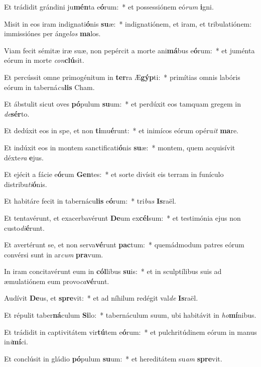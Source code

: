 \item Et trádidit grándini ju\textbf{mén}ta e\textbf{ó}rum:~* et possessiónem eó\textit{rum} \textbf{i}gni.
\item Misit in eos iram indignati\textbf{ó}nis \textbf{su}æ:~* indignatiónem, et iram, et tribulatiónem: immissiónes per ánge\textit{los} \textbf{ma}los.
\item Viam fecit sémitæ iræ suæ, non pepércit a morte ani\textbf{má}bus e\textbf{ó}rum:~* et juménta eórum in morte \textit{con}\textbf{clú}sit.
\item Et percússit omne primogénitum in \textbf{ter}ra Æ\textbf{gýp}ti:~* primítias omnis labóris eórum in taberná\textit{cu}\textbf{lis} Cham.
\item Et ábstulit sicut oves \textbf{pó}pulum \textbf{su}um:~* et perdúxit eos tamquam gregem in \textit{de}\textbf{sér}to.
\item Et dedúxit eos in spe, et non \textbf{ti}mu\textbf{é}runt:~* et inimícos eórum opéru\textit{it} \textbf{ma}re.
\item Et indúxit eos in montem sanctificati\textbf{ó}nis \textbf{su}æ:~* montem, quem acquisívit déxte\textit{ra} \textbf{e}jus.
\item Et ejécit a fácie e\textbf{ó}rum \textbf{Gen}tes:~* et sorte divísit eis terram in funículo distribu\textit{ti}\textbf{ó}nis.
\item Et habitáre fecit in tabernácu\textbf{lis} e\textbf{ó}rum:~* tri\textit{bus} \textbf{Is}raël.
\item Et tentavérunt, et exacerbavérunt \textbf{De}um ex\textbf{cél}sum:~* et testimónia ejus non custo\textit{di}\textbf{é}runt.
\item Et avertérunt se, et non serva\textbf{vé}runt \textbf{pac}tum:~* quemádmodum patres eórum convérsi sunt in ar\textit{cum} \textbf{pra}vum.
\item In iram concitavérunt eum in \textbf{cól}libus \textbf{su}is:~* et in sculptílibus suis ad æmulatiónem eum provo\textit{ca}\textbf{vé}runt.
\item Audívit \textbf{De}us, et \textbf{spre}vit:~* et ad níhilum redégit val\textit{de} \textbf{Is}raël.
\item Et répulit taber\textbf{ná}culum \textbf{Si}lo:~* tabernáculum suum, ubi habitávit in \textit{ho}\textbf{mí}nibus.
\item Et trádidit in captivitátem vir\textbf{tú}tem e\textbf{ó}rum:~* et pulchritúdinem eórum in manus in\textit{i}\textbf{mí}ci.
\item Et conclúsit in gládio \textbf{pó}pulum \textbf{su}um:~* et hereditátem su\textit{am} \textbf{spre}vit.

